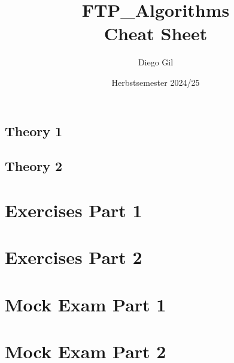 \documentclass[11pt,a4paper]{article}
\title{\textbf{FTP\_Algorithms}\\
       \large Cheat Sheet}
\author{Diego Gil}
\date{Herbstsemester 2024/25}
\begin{document}
\maketitle

\begin{multicols}{2}
\tableofcontents
\end{multicols}
\newpage

\begin{multicols}{2}

\subsection{Theory 1}
  

\subsection{Theory 2}


\end{multicols}

\newpage

\section{Exercises Part 1}
\begin{multicols}{2}





\end{multicols}

\section{Exercises Part 2}
\begin{multicols}{2}

\end{multicols}

\section{Mock Exam Part 1}
\begin{multicols}{2}
\end{multicols}

\section{Mock Exam Part 2}
\begin{multicols}{2}

\end{multicols}
\end{document}
